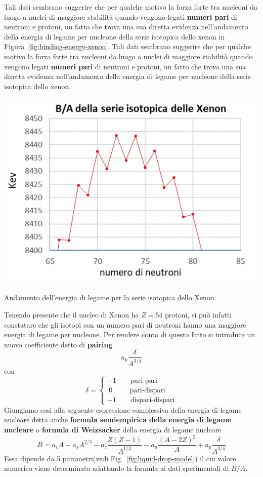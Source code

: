Tali dati sembrano suggerire che per qualche motivo la forza forte tra
nucleoni da luogo a nuclei di maggiore stabilità quando vengono legati
\textbf{numeri pari} di neutroni e protoni, un fatto che trova una sua
diretta evidenza nell'andamento della energia di legame per nucleone
della serie isotopica dello xenon in Figura~\ref{fig:binding-energy-xenon}.
Tali dati sembrano suggerire che per qualche motivo la forza forte tra nucleoni da luogo a nuclei di maggiore stabilità
quando vengono legati \textbf{numeri pari} di neutroni e protoni, un fatto che trova una sua diretta evidenza nell’andamento della energia di legame per nucleone della serie isotopica dello xenon.
\begin{marginfigure}
	\includegraphics[scale = 1.5]{figs/goccia5}
	\caption{Andamento dell'energia di legame per la serie isotopica dello Xenon.}
	\label{fig:binding-energy-xenon}
\end{marginfigure}
Tenendo presente che il nucleo di Xenon ha \(Z=54\) protoni, si può
infatti constatare che gli isotopi con un numero pari di neutroni hanno
una maggiore energia di legame per nucleone.
Per rendere conto di questo
fatto si introduce un nuovo coefficiente detto di \textbf{pairing} \[
	a_{p} \frac{\delta}{A^{3/4}}
\] con \[
	\delta =
	\begin{cases}
		+1    \qquad  \text{pari-pari}       \\
		\ 0  \qquad  \ \ \text{pari-dispari} \\
		-1  \qquad  \text{dispari-dispari}
	\end{cases}
\] Giungiamo così alla seguente espressione complessiva della energia di
legame nucleare detta anche \textbf{formula semiempirica della energia
	di legame nucleare} o \textbf{formula di Weizsacker} della energia di
legame nucleare
\begin{equation}
	\boxed{    B = a_{v}A - a_{s}A^{2/3} - a_{c} \frac{Z(Z-1)}{A^{1/3}} - a_{a}\frac{(A-2Z)^{2}}{A} +     a_{p} \frac{\delta}{A^{3/4}}}
	\label{eq:weizsacker-formula}
\end{equation} Essa dipende da 5 parametri(vedi Fig.~\ref{fig:liquid-drop-model}) il cui valore numerico
viene determinato adattando la formula ai dati sperimentali di \(B/A\).

